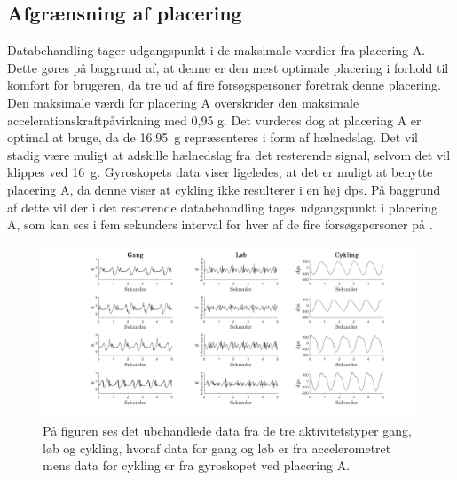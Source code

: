 \subsection{Afgrænsning af placering}
Databehandling tager udgangspunkt i de maksimale værdier fra placering A. Dette gøres på baggrund af, at denne er den mest optimale placering i forhold til komfort for brugeren, da tre ud af fire forsøgspersoner foretrak denne placering. Den maksimale værdi for placering A overskrider den maksimale accelerationskraftpåvirkning med 0,95 g. Det vurderes dog at placering A er optimal at bruge, da de 16,95~g repræsenteres i form af hælnedslag. Det vil stadig være muligt at adskille hælnedslag fra det resterende signal, selvom det vil klippes ved 16~g. \newline
Gyroskopets data viser ligeledes, at det er muligt at benytte placering A, da denne viser at cykling ikke resulterer i en høj dps. På baggrund af dette vil der i det resterende databehandling tages udgangspunkt i placering A, som kan ses i fem sekunders interval for hver af de fire forsøgspersoner på .
\begin{figure}[H]
	\centering
	\includegraphics[scale=0.38]{figures/qBilag/raa_data}
	\caption{På figuren ses det ubehandlede data fra de tre aktivitetstyper gang, løb og cykling, hvoraf data for gang og løb er fra accelerometret mens data for cykling er fra gyroskopet ved placering A.}
	\label{raa_data}
\end{figure}\vspace{-.25cm}

